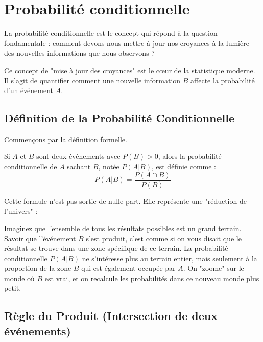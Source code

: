 \newpage

\section{Probabilité conditionnelle}

\begin{intuitionbox}
La probabilité conditionnelle est le concept qui répond à la question fondamentale : comment devons-nous mettre à jour nos croyances à la lumière des nouvelles informations que nous observons ?
\end{intuitionbox}

Ce concept de "mise à jour des croyances" est le cœur de la statistique moderne. Il s'agit de quantifier comment une nouvelle information $B$ affecte la probabilité d'un événement $A$.

\subsection{Définition de la Probabilité Conditionnelle}

Commençons par la définition formelle.

\begin{definitionbox}
Si $A$ et $B$ sont deux événements avec $P(B) > 0$, alors la probabilité conditionnelle de $A$ sachant $B$, notée $P(A|B)$, est définie comme :
$$P(A|B) = \frac{P(A \cap B)}{P(B)}$$
\end{definitionbox}

Cette formule n'est pas sortie de nulle part. Elle représente une "réduction de l'univers" :

\begin{intuitionbox}
Imaginez que l'ensemble de tous les résultats possibles est un grand terrain. Savoir que l'événement $B$ s'est produit, c'est comme si on vous disait que le résultat se trouve dans une zone spécifique de ce terrain. La probabilité conditionnelle $P(A|B)$ ne s'intéresse plus au terrain entier, mais seulement à la proportion de la zone $B$ qui est également occupée par $A$. On "zoome" sur le monde où $B$ est vrai, et on recalcule les probabilités dans ce nouveau monde plus petit.
\end{intuitionbox}

\subsection{Règle du Produit (Intersection de deux événements)}

